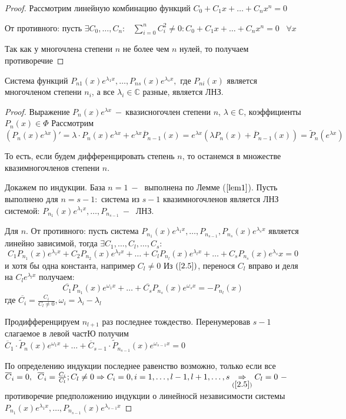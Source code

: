 \begin{proof}
Рассмотрим линейную комбинацию функций $C_0+C_1x+\dots+C_nx^n=0$\par От противного: пусть $\exists C_0,\dots,C_n:\;\;\;\displaystyle\sum_{i=0}^n C_i^2\neq0: C_0+C_1x+\dots+C_nx^n=0\;\;\;\forall x $\par Так как у многочлена степени $n$ не более чем $n$ нулей, то получаем противоречие
\end{proof}
\begin{theorem}
Система функций $P_{n1}(x)e^{\lambda_1 x},\dots,P_{ns}(x)e^{\lambda_s x},$ где $P_{ni}(x)$ является многочленом степени $n_i$, а все $\lambda_i \in \mathds{C}$ разные, является ЛНЗ.
\end{theorem}
\begin{proof}
Выражение $P_n(x)e^{\lambda x}~-~$квазисногочлен степени $n$, $\lambda\in\mathds{C}$, коэффициенты $P_n(
x)\in\varPhi$
Рассмотрим $(P_n(x)e^{\lambda x})'=\lambda\cdot P_n(x)e^{\lambda x}+e^{\lambda x}\overline{P}_{n-1}(x)=e^{\lambda x }(\lambda P_n(x)+\overline{P}_{n-1}(x))= \widetilde{P}_n(e^{\lambda x})$\par То есть, если будем дифференцировать степень $n$, то останемся в множестве квазимногочленов степени $n$.\par
Докажем по индукции. База $n=1~-~$ выполнена по Лемме ($\ref{lem1}$). Пусть выполнено для $n=s-1:$ система из $s-1$ квазимногочленов является ЛНЗ системой: $P_{n_1}(x)e^{\lambda_1x},\dots,P_{n_{s-1}}~-~$ ЛНЗ.\par
Для $n$. От противного: пусть система $P_{n_1}(x)e^{\lambda_1x},\dots,P_{n_{s-1}}, P_{n_s}(x)e^{\lambda_s x}$ является линейно зависимой, тогда $\exists C_1,\dots,C_l,\dots,C_s:$
\begin{equation}
    \tag{2.5}
    \label{2.5}
    C_1P_{n_1}(x)e^{\lambda_1x}+C_2P_{n_2}(x)e^{\lambda_2x}+\dots+C_lP_{n_l}(x)e^{\lambda_lx}+\dots+C_sP_{n_s}(x)e^{\lambda_s}x=0
\end{equation}
и хотя бы одна константа, например $C_l\neq0$ Из $(\ref{2.5})$, перенося $C_l$ вправо и деля на $C_le^{\lambda_lx}$ получаем:
$$\overline{C_1}P_{n_1}(x)e^{\omega_1x}+\dots+\overline{C_s}P_{n_s}(x)e^{\omega_sx}=-P_{n_l}(x)$$ где $\overline{C_i}=\frac{C_i}{C_l\neq0},\omega_i=\lambda_i-\lambda_l$\par Продифференцируем $n_{l+1}$ раз последнее тождество. Перенумеровав $s-1$ слагаемое в левой частЮ получим $\overline{C}_1\cdot \widetilde{P}_n(x)e^{\omega_1x}+\dots+\overline{C}_{s-1} \cdot \widetilde{P}_{n_{s-1}}(x)e^{\omega_{s-1}x}=0$\par По определению индукции последнее равенство возможно, только если  все $\overline{C}_i=0,\;\;\overline{C}_i=\frac{C_i}{C_l};C_l\neq 0 \Rightarrow C_i =0, i=1,\dots, l-1,l+1,\dots, s\underset{(\ref{2.5})}{\Rightarrow} C_l=0~-~$ противоречие рпедположению индукции о линейносй независимости системы $P_{n_1}(x)e^{\lambda_1x},\dots,P_{n_{s-1}}(x)e^{\lambda_{s-1}x}$
\end{proof}
